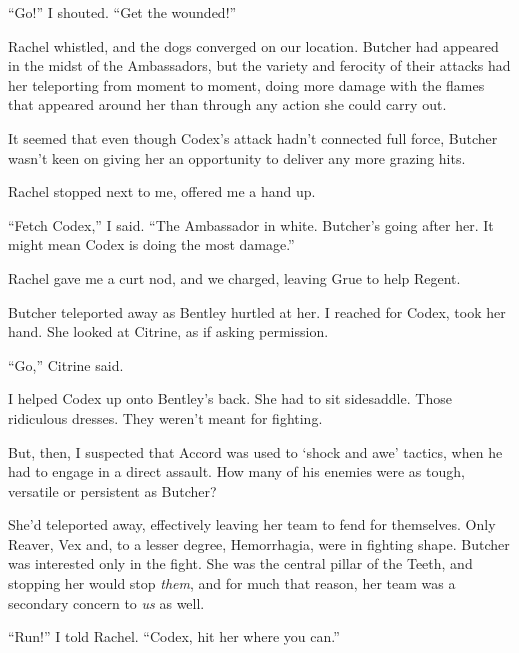 ``Go!'' I shouted.  ``Get the wounded!''



Rachel whistled, and the dogs converged on our location.  Butcher had appeared in the midst of the Ambassadors, but the variety and ferocity of their attacks had her teleporting from moment to moment, doing more damage with the flames that appeared around her than through any action she could carry out.



It seemed that even though Codex's attack hadn't connected full force, Butcher wasn't keen on giving her an opportunity to deliver any more grazing hits.



Rachel stopped next to me, offered me a hand up.



``Fetch Codex,'' I said.  ``The Ambassador in white.  Butcher's going after her.  It might mean Codex is doing the most damage.''



Rachel gave me a curt nod, and we charged, leaving Grue to help Regent.



Butcher teleported away as Bentley hurtled at her.  I reached for Codex, took her hand.  She looked at Citrine, as if asking permission.



``Go,'' Citrine said.



I helped Codex up onto Bentley's back.  She had to sit sidesaddle.  Those ridiculous dresses.  They weren't meant for fighting.



But, then, I suspected that Accord was used to `shock and awe' tactics, when he had to engage in a direct assault.  How many of his enemies were as tough, versatile or persistent as Butcher?



She'd teleported away, effectively leaving her team to fend for themselves.  Only Reaver, Vex and, to a lesser degree, Hemorrhagia, were in fighting shape.  Butcher was interested only in the fight.  She was the central pillar of the Teeth, and stopping her would stop \emph{them}, and for much that reason, her team was a secondary concern to \emph{us} as well.



``Run!'' I told Rachel.  ``Codex, hit her where you can.''



